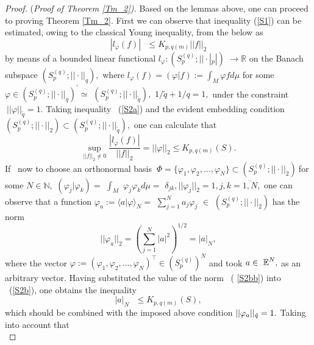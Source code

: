 \documentclass[pdflatex,sn-mathphys-num]{sn-jnl}%
\theoremstyle{thmstyleone}%
\theoremstyle{thmstyletwo}%
\theoremstyle{thmstylethree}%
\begin{document}
\begin{proof}
	(\textit{Proof of Theorem \ref{Tm_2}). }Based on the lemmas above, one can
	proceed to proving Theorem \ref{Tm_2}. First we can observe that
	inequality (\ref{S1}) can be estimated, owing to the classical Young
	inequality, from the below as 
	\begin{equation}
		|l_{\varphi }(f)|\text{ }\leq K_{p,q(m)} ||f||_{2}  \label{S2a}
	\end{equation}%
	by means of a bounded linear functional $l_{\varphi }:(S_{p}^{(q)};||\cdot
	|_{p}|)$ $\rightarrow \mathbb{R}$ on the Banach subspace $%
	(S_{p}^{(q)};||\cdot ||_{q}),$ where $l_{\varphi }(f)=(\varphi
	|f):=\int_{M}\varphi fd\mu $ for some $\varphi \in (S_{p}^{(q)};||\cdot
	||_{q})^{\prime }\simeq $ $(S_{p}^{(q)};||\cdot ||_{\tilde{q}}),$ $1/\tilde{q%
	}+1/q=1,$ under the constraint $\ ||\varphi ||_{\tilde{q}}=1.$ Taking
	inequality \ (\ref{S2a}) and the evident embedding condition $%
	(S_{p}^{(q)};||\cdot ||_{2})\subset (S_{p}^{(q)};||\cdot ||_{\tilde{q}}),$
	one can calculate that 
	\begin{equation}
		\sup_{||f||_{2}\neq 0}\frac{|l_{\varphi }(f)|}{||f||_{2}}=||\varphi
		||_{2}\leq K_{p,q(m)}(S).  \label{S2b}
	\end{equation}%
	If \ now to choose an orthonormal basis $\ \Phi =\{\varphi _{1},\varphi
	_{2},...,\varphi _{N}\}\subset (S_{p}^{(q)};||\cdot ||_{2})\ $for some $N\in 
	\mathbb{N},$ $(\varphi _{j}|\varphi _{k})=$ $\int_{M}$ $\varphi _{j}\varphi
	_{k}d\mu =$ $\delta _{jk},||\varphi _{j}||_{2}=1,j,k=\overline{1,N},$ one
	can observe that a function $\varphi _{a}:=\langle a|\varphi \rangle _{N}=$ $%
	\sum_{j=1}^{N}a_{j}\varphi _{j}$ $\in $ $(S_{p}^{(q)};||\cdot ||_{2})$ has
	the norm 
	\begin{equation}
		||\varphi _{a}||_{2}=\left( \sum_{j=1}^{N}|a|^{2}\right) ^{1/2}=|a|_{N},
		\label{S2bb}
	\end{equation}%
	where the vector $\varphi :=(\varphi _{1},\varphi _{2},...,\varphi
	_{N})^{\intercal }\in \left( S_{p}^{(q)}\right) ^{N}$ and took $a\in \mathbb{%
		\ E}^{N},$ as an arbitrary vector. Having substituted the value of the norm
	\ ( \ref{S2bb}) into \ (\ref{S2b}), one obtains the inequality 
	\begin{equation}
		|a|_{N}\text{ }\leq K_{p,q(m)}(S),  \label{S3}
	\end{equation}%
	which should be combined with the imposed above condition $||\varphi _{a}||_{%
		\tilde{q}}=1.$ Taking into account that 
	\begin{equation}

\end{equation}
\end{proof}
\end{document}
